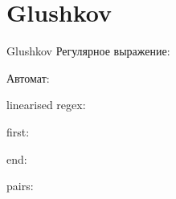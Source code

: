 \section{Glushkov}
\begin{frame}{Glushkov}
	Регулярное выражение:

	Автомат:


	linearised regex:


	first:


	end:


	pairs:


\end{frame}




